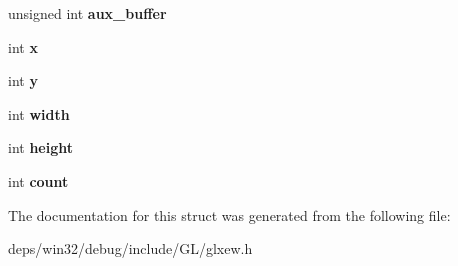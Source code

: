 \begin{DoxyCompactItemize}
\item 
\hypertarget{struct_g_l_x_pbuffer_clobber_event_a13193b6e7e3e52b15f754fe91403b7ec}{}unsigned int {\bfseries aux\+\_\+buffer}\label{struct_g_l_x_pbuffer_clobber_event_a13193b6e7e3e52b15f754fe91403b7ec}

\item 
\hypertarget{struct_g_l_x_pbuffer_clobber_event_a8f0a7162a033c89ee94ce535580dbc32}{}int {\bfseries x}\label{struct_g_l_x_pbuffer_clobber_event_a8f0a7162a033c89ee94ce535580dbc32}

\item 
\hypertarget{struct_g_l_x_pbuffer_clobber_event_a69eb7ac60d36ac3ec4550ac206cfc61f}{}int {\bfseries y}\label{struct_g_l_x_pbuffer_clobber_event_a69eb7ac60d36ac3ec4550ac206cfc61f}

\item 
\hypertarget{struct_g_l_x_pbuffer_clobber_event_aaca375fecb872c73c60cd5d0bfc7c7a5}{}int {\bfseries width}\label{struct_g_l_x_pbuffer_clobber_event_aaca375fecb872c73c60cd5d0bfc7c7a5}

\item 
\hypertarget{struct_g_l_x_pbuffer_clobber_event_aed4e539c896bdad15217bf92c28f8520}{}int {\bfseries height}\label{struct_g_l_x_pbuffer_clobber_event_aed4e539c896bdad15217bf92c28f8520}

\item 
\hypertarget{struct_g_l_x_pbuffer_clobber_event_a61e9f6b31738464dca67f909fcacd298}{}int {\bfseries count}\label{struct_g_l_x_pbuffer_clobber_event_a61e9f6b31738464dca67f909fcacd298}

\end{DoxyCompactItemize}


The documentation for this struct was generated from the following file\+:\begin{DoxyCompactItemize}
\item 
deps/win32/debug/include/\+G\+L/glxew.\+h\end{DoxyCompactItemize}
